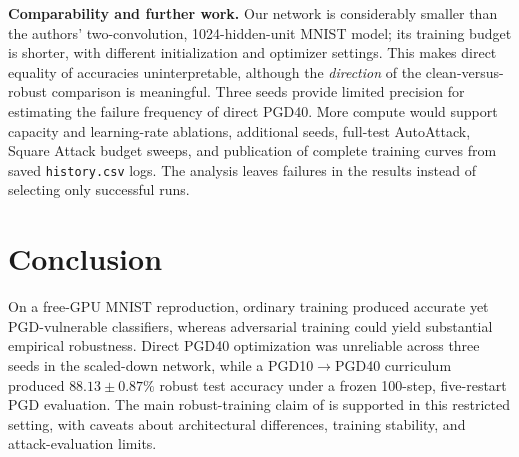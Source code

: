\documentclass[11pt,a4paper]{article}
\newif\ifshowguides
\newcommand{\guide}[1]{%
  \ifshowguides
  \par\medskip\noindent
  \fcolorbox{guideframe}{guidebg}{%
    \begin{minipage}{\dimexpr\linewidth-2\fboxsep-2\fboxrule\relax}
      \small\textbf{Guide.}
      \begin{itemize}[leftmargin=1.2em,itemsep=1pt,topsep=2pt]
        #1
      \end{itemize}
    \end{minipage}}%
  \par\medskip
  \fi}
\begin{document}
\textbf{Comparability and further work.} Our network is considerably smaller than the authors' two-convolution, 1024-hidden-unit MNIST model; its training budget is shorter, with different initialization and optimizer settings. This makes direct equality of accuracies uninterpretable, although the \emph{direction} of the clean-versus-robust comparison is meaningful. Three seeds provide limited precision for estimating the failure frequency of direct PGD40. More compute would support capacity and learning-rate ablations, additional seeds, full-test AutoAttack, Square Attack budget sweeps, and publication of complete training curves from saved \texttt{history.csv} logs. The analysis leaves failures in the results instead of selecting only successful runs.


\guide{
  \item Answer directly: does the claim hold in your setting, partially hold, or not hold?
  \item Explain every agreement and disagreement with the original results using the theory from Section~\ref{sec:method} and your deviations from Section~\ref{sec:setup}.
  \item State which conclusions depend on seed, initialization or hyperparameter choices. If the difference between two methods is smaller than the spread over seeds, say so.
  \item A careful, well-explained failure to reproduce is a valid result. An unexplained one is not.
  \item State the limitations of your reproduction and what you would test next with more compute.
}

\section{Conclusion}
\label{sec:conclusion}
On a free-GPU MNIST reproduction, ordinary training produced accurate yet PGD-vulnerable classifiers, whereas adversarial training could yield substantial empirical robustness. Direct PGD40 optimization was unreliable across three seeds in the scaled-down network, while a PGD10$\rightarrow$PGD40 curriculum produced $88.13\pm0.87\%$ robust test accuracy under a frozen 100-step, five-restart PGD evaluation. The main robust-training claim of \citet{madry2018towards} is supported in this restricted setting, with caveats about architectural differences, training stability, and attack-evaluation limits.


\guide{
  \item A short paragraph: what you tested, what you found, and what it means for the paper's claim.
  \item No new results or arguments here.
}
\end{document}
